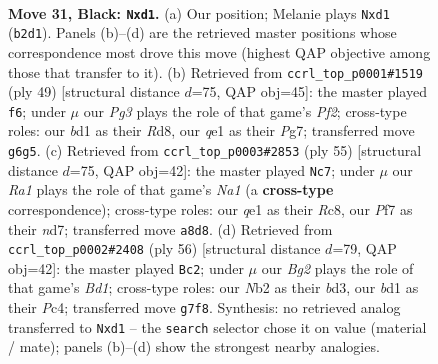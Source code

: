 \documentclass[11pt]{article}
\begin{document}
\clearpage

\begin{figure}[p]\centering
\begin{subfigure}{0.46\textwidth}\centering
\resizebox{\linewidth}{!}{%
\newchessgame
\chessboard[
  setfen={r5k1/1p3pb1/5qp1/p2p4/3n3p/7P/Pn3PPB/RN1BQK2 b - - 1 31},
  showmover=false,
  pgfstyle=straightmove, color=movearrow, markmove={b2-d1}
]}
\caption{}
\end{subfigure}\hfill
\begin{subfigure}{0.46\textwidth}\centering
\resizebox{\linewidth}{!}{%
\newchessgame
\chessboard[
  setfen={3r2k1/p1q2pp1/2p3n1/1pP2bBp/1Q6/6PP/PP3PBK/4R3 b - - 1 25},
  showmover=false,
  pgfstyle=straightmove, color=movearrow, markmove={f7-f6}
]}
\caption{}
\end{subfigure}
\\[4pt]
\begin{subfigure}{0.46\textwidth}\centering
\resizebox{\linewidth}{!}{%
\newchessgame
\chessboard[
  setfen={n1r3k1/3N1ppp/4p2q/8/Pp2P1Q1/1n4P1/1B3b1P/3R1B1K b - - 5 28},
  showmover=false,
  pgfstyle=straightmove, color=movearrow, markmove={a8-c7}
]}
\caption{}
\end{subfigure}\hfill
\begin{subfigure}{0.46\textwidth}\centering
\resizebox{\linewidth}{!}{%
\newchessgame
\chessboard[
  setfen={1k1r4/1p1q4/2p4b/4R2p/2P2p2/PQ1b1N1P/1P4P1/2KB4 w - - 3 29},
  showmover=false,
  pgfstyle=straightmove, color=movearrow, markmove={d1-c2}
]}
\caption{}
\end{subfigure}
\caption{\textbf{Move 31, Black: \texttt{Nxd1}.} (a) Our position; Melanie plays \texttt{Nxd1} (\texttt{b2d1}). Panels (b)--(d) are the retrieved master positions whose correspondence most drove this move (highest QAP objective among those that transfer to it). (b) Retrieved from \texttt{ccrl\_top\_p0001\#1519} (ply 49) [structural distance $d$=75, QAP obj=45]: the master played \texttt{f6}; under $\mu$ our \emph{Pg3} plays the role of that game's \emph{Pf2}; cross-type roles: our \emph{b}d1 as their \emph{R}d8, our \emph{q}e1 as their \emph{P}g7; transferred move \texttt{g6g5}. (c) Retrieved from \texttt{ccrl\_top\_p0003\#2853} (ply 55) [structural distance $d$=75, QAP obj=42]: the master played \texttt{Nc7}; under $\mu$ our \emph{Ra1} plays the role of that game's \emph{Na1} (a \textbf{cross-type} correspondence); cross-type roles: our \emph{q}e1 as their \emph{R}c8, our \emph{P}f7 as their \emph{n}d7; transferred move \texttt{a8d8}. (d) Retrieved from \texttt{ccrl\_top\_p0002\#2408} (ply 56) [structural distance $d$=79, QAP obj=42]: the master played \texttt{Bc2}; under $\mu$ our \emph{Bg2} plays the role of that game's \emph{Bd1}; cross-type roles: our \emph{N}b2 as their \emph{b}d3, our \emph{b}d1 as their \emph{P}c4; transferred move \texttt{g7f8}. Synthesis: no retrieved analog transferred to \texttt{Nxd1} -- the \texttt{search} selector chose it on value (material / mate); panels (b)--(d) show the strongest nearby analogies.}
\label{fig:thought-m61}
\end{figure}
\end{document}
